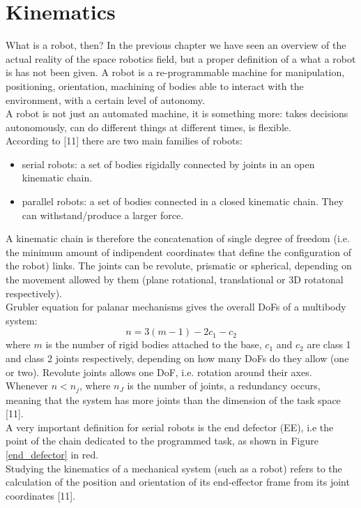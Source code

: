 \documentclass[a4paper,12pt,oneside]{report}
\begin{document}
\chapter{Kinematics}\label{kinematics}
What is a robot, then? In the previous chapter we have seen an overview of the actual reality of the space robotics field, but a proper definition of a what a robot is has not been given. A robot is a re-programmable machine for manipulation, positioning, orientation, machining of bodies able to interact with the environment, with a certain level of autonomy.\\
A robot is not just an automated machine, it is something more: takes decisions autonomously, can do different things at different times, is flexible.\\
According to [11] there are two main families of robots:
\begin{itemize}
  \item serial robots: a set of bodies rigidally connected by joints in an open kinematic chain.
  \item parallel robots: a set of bodies connected in a closed kinematic chain. They can withstand/produce a larger force.
\end{itemize}
A kinematic chain is therefore the concatenation of single degree of freedom (i.e. the minimum amount of indipendent coordinates that define the configuration of the robot) links. The joints can be revolute, prismatic or spherical, depending on the movement allowed by them (plane rotational, translational or 3D rotatonal respectively).\\
Grubler equation for palanar mechanisms gives the overall DoFs of a multibody system:
\begin{equation}
  n = 3(m-1)-2c_1-c_2
  \label{grubler}
\end{equation}
where $m$ is the number of rigid bodies attached to the base, $c_1$ and $c_2$ are class 1 and class 2 joints respectively, depending on how many DoFs do they allow (one or two). Revolute joints allows one DoF, i.e. rotation around their axes.\\
Whenever $n<n_j$, where $n_J$ is the number of joints, a redundancy occurs, meaning that the system has more joints than the dimension of the task space [11].\\
A very important definition for serial robots is the end defector (EE), i.e the point of the chain dedicated to the programmed task, as shown in Figure \ref{end_defector} in red.\\
Studying the kinematics of a mechanical system (such as a robot) refers to the calculation of the position and orientation of its end-eﬀector frame from its joint coordinates [11].\\
\end{document}
